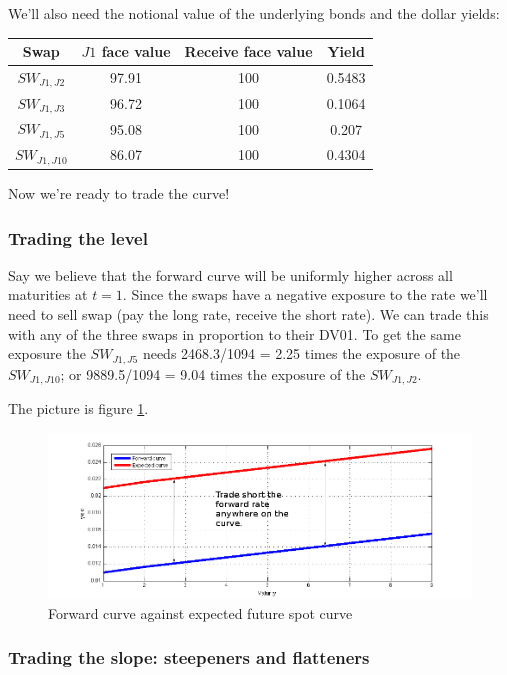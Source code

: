 We'll also need the notional value of the underlying bonds and the dollar yields:

\begin{center}
\begin{tabular}{|c|ccc|}
\hline
Swap & $J1$ face value & Receive face value & Yield  \\
\hline
$SW_{J1,J2}$  & 97.91 & 100  & 0.5483  \\ 
$SW_{J1,J3}$  & 96.72  & 100  & 0.1064   \\ 
$SW_{J1,J5} $ & 95.08  & 100  & 0.207  \\ 
$SW_{J1,J10}$  & 86.07 &  100 &0.4304  \\ 
\hline
\end{tabular}
\end{center}

Now we're ready to trade the curve!

\subsubsection{Trading the level}

Say we believe that the forward curve will be uniformly higher across all maturities at $t=1$. Since the swaps have a negative exposure to the rate we'll need to sell swap (pay the long rate, receive the short rate). We can trade this with any of the three swaps in proportion to their DV01. To get the same exposure the $SW_{J1,J5}$ needs 2468.3/1094 = 2.25 times the exposure of the $SW_{J1,J10}$; or 9889.5/1094 = 9.04 times the exposure of the $SW_{J1,J2}$.

The picture is figure \ref{fig:level}.

\begin{figure}[ht]
\centering
  \includegraphics[width=5in] {pics/level}
\caption{Forward curve against expected future spot curve}
\label{fig:level}
\end{figure}

\subsubsection{Trading the slope: steepeners and flatteners}

